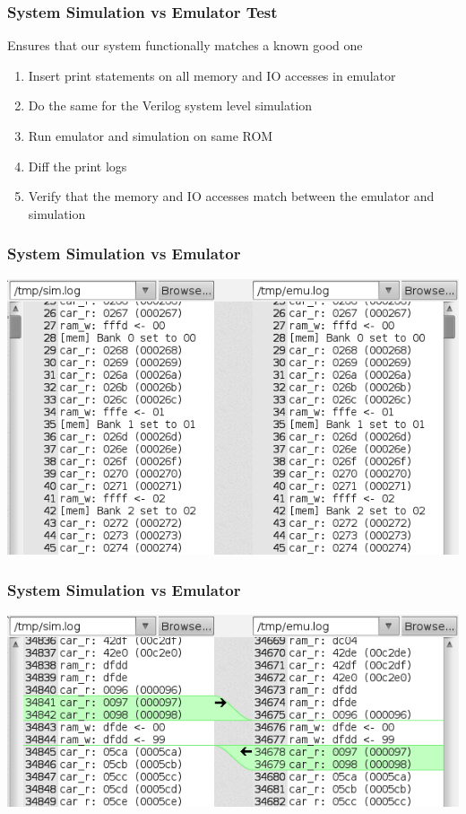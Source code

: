 \documentclass[xcolor=table]{beamer}
\newlength{\wideitemsep}
\let\olditem\item
\renewcommand{\item}{\setlength{\itemsep}{\wideitemsep}\olditem}
\begin{document}
\begin{frame}
    \frametitle{System Simulation vs Emulator Test}
    Ensures that our system functionally matches a known good one
    \vspace{\baselineskip}
    \begin{enumerate}
        \item Insert print statements on all memory and IO accesses in emulator
        \item Do the same for the Verilog system level simulation
        \item Run emulator and simulation on same ROM
        \item Diff the print logs
        \item Verify that the memory and IO accesses match between the emulator
            and simulation
    \end{enumerate}
\end{frame}

\begin{frame}
    \frametitle{System Simulation vs Emulator}
    \includegraphics[width=\textwidth]{../images/diff_good.png}
\end{frame}

\begin{frame}
    \frametitle{System Simulation vs Emulator}
    \includegraphics[width=\textwidth]{../images/diff_weird.png}
\end{frame}
\end{document}
